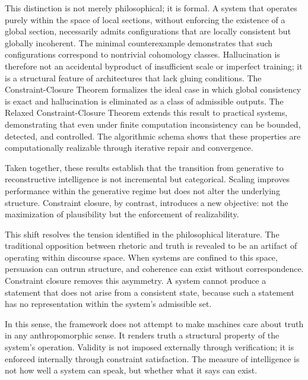 \documentclass[11pt, oneside]{article}
\begin{document}
This distinction is not merely philosophical; it is formal. A system that operates purely within the space of local sections, without enforcing the existence of a global section, necessarily admits configurations that are locally consistent but globally incoherent. The minimal counterexample demonstrates that such configurations correspond to nontrivial cohomology classes. Hallucination is therefore not an accidental byproduct of insufficient scale or imperfect training; it is a structural feature of architectures that lack gluing conditions. The Constraint-Closure Theorem formalizes the ideal case in which global consistency is exact and hallucination is eliminated as a class of admissible outputs. The Relaxed Constraint-Closure Theorem extends this result to practical systems, demonstrating that even under finite computation inconsistency can be bounded, detected, and controlled. The algorithmic schema shows that these properties are computationally realizable through iterative repair and convergence.

Taken together, these results establish that the transition from generative to reconstructive intelligence is not incremental but categorical. Scaling improves performance within the generative regime but does not alter the underlying structure. Constraint closure, by contrast, introduces a new objective: not the maximization of plausibility but the enforcement of realizability.

This shift resolves the tension identified in the philosophical literature. The traditional opposition between rhetoric and truth is revealed to be an artifact of operating within discourse space. When systems are confined to this space, persuasion can outrun structure, and coherence can exist without correspondence. Constraint closure removes this asymmetry. A system cannot produce a statement that does not arise from a consistent state, because such a statement has no representation within the system's admissible set.

In this sense, the framework does not attempt to make machines care about truth in any anthropomorphic sense. It renders truth a structural property of the system's operation. Validity is not imposed externally through verification; it is enforced internally through constraint satisfaction. The measure of intelligence is not how well a system can speak, but whether what it says can exist.
\end{document}
